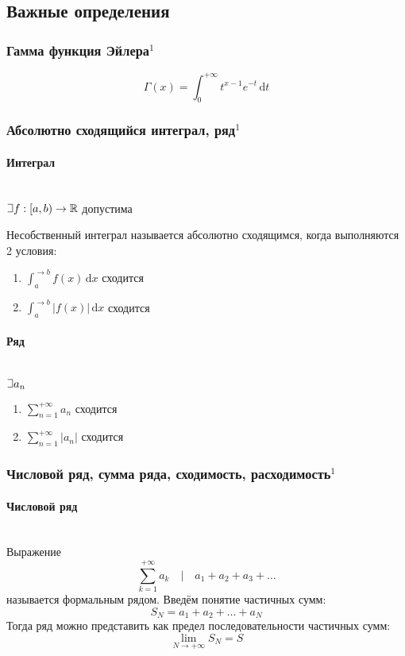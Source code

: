 \documentclass{article}
\def\letus{%
\mathord{\setbox0=\hbox{$\exists$}%
         \hbox{\kern 0.125\wd0%
               \vbox to \ht0{%
                  \hrule width 0.75\wd0%
                  \vfill%
                  \hrule width 0.75\wd0}%
               \vrule height \ht0%
               \kern 0.125\wd0}%
       }%
        }
\def\D{\,\mathrm{d}}
\let\vanillaparagraph\paragraph
\renewcommand{\paragraph}[1]{\vanillaparagraph{#1}\mbox{}\\}
\begin{document}
\subsection{Важные определения}
\subsubsection{Гамма функция Эйлера\texorpdfstring{$^1$}{}}
$$
\Gamma(x) = \int^{+\infty}_0 t^{x-1} e^{-t} \D t
$$

\subsubsection{Абсолютно сходящийся интеграл, ряд\texorpdfstring{$^1$}{}}
\paragraph{Интеграл}
$\letus f: [ a, b ) \rightarrow \mathbb{R} $ допустима

Несобственный интеграл называется абсолютно сходящимся, когда выполняются 2 условия:
\begin{enumerate}
    \item $\int_a^{\rightarrow b} f(x) \D x$ сходится
    \item $\int_a^{\rightarrow b} |f(x)| \D x$ сходится
\end{enumerate}

\paragraph{Ряд}
$\letus a_n$
\begin{enumerate}
    \item $\sum_{n=1}^{+\infty} a_n$ сходится
    \item $\sum_{n=1}^{+\infty} |a_n|$ сходится
\end{enumerate}

\subsubsection{Числовой ряд, сумма ряда, сходимость, расходимость\texorpdfstring{$^1$}{}}
\paragraph{Числовой ряд}
Выражение
$$
\sum_{k=1}^{+\infty} a_k \quad | \quad a_1+a_2+a_3+\ldots
$$
называется формальным рядом. Введём понятие частичных сумм:
$$
S_N = a_1+a_2+\ldots+a_N
$$
Тогда ряд можно представить как предел последовательности частичных сумм:
$$
\lim_{N\rightarrow +\infty} S_N = S
$$
\end{document}
